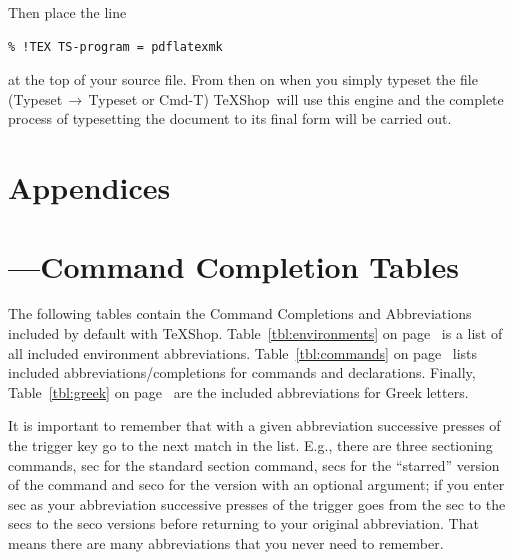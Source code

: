 \documentclass[letterpaper,11pt]{article}
\newcommand{\TS}{\textsf{\TeX Shop}}
\newcommand{\cmd}[1]{\textsf{#1}}
\newcommand{\mnu}[1]{\textsf{#1}}
\newcommand{\To}{\,\(\to\)\,}
\begin{document}
Then place the line
\begin{verbatim}
% !TEX TS-program = pdflatexmk
\end{verbatim}
at the top of your source file. From then on when you simply typeset the file (\mnu{Typeset}\To\mnu{Typeset} or \cmd{Cmd-T}) \TS\ will use this engine and the complete process of typesetting the document to its final form will be carried out.

\section*{Appendices}
\appendix



\section{---\quad Command Completion Tables}\label{sec:CCTables}
The following tables contain the Command Completions and Abbreviations included by default with \TS. Table~\ref{tbl:environments} on page~\pageref{tbl:environments} is a list of all included environment abbreviations. Table~\ref{tbl:commands} on page~\pageref{tbl:commands} lists included abbreviations/completions for commands and declarations. Finally, Table~\ref{tbl:greek} on page~\pageref{tbl:greek} are the included abbreviations for Greek letters.

It is important to remember that with a given abbreviation successive presses of the trigger key go to the next match in the list. E.g., there are three sectioning commands, \cmd{sec} for the standard section command, \cmd{secs} for the ``starred'' version of the command and \cmd{seco} for the version with an optional argument; if you enter \cmd{sec} as your abbreviation successive presses of the trigger goes from the \cmd{sec} to the \cmd{secs} to the \cmd{seco} versions before returning to your original abbreviation. That means there are many abbreviations that you never need to remember.
\end{document}
